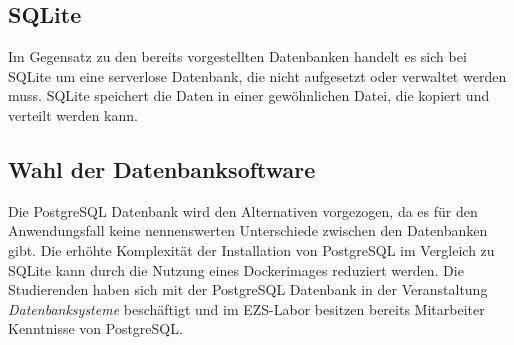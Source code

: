 \subsection{SQLite}
Im Gegensatz zu den bereits vorgestellten Datenbanken handelt es sich bei SQLite um eine serverlose Datenbank, die nicht aufgesetzt oder verwaltet werden muss. SQLite speichert die Daten in einer gewöhnlichen Datei, die kopiert und verteilt werden kann. \cite{sqliteFeaturesSQLite}

\subsection{Wahl der Datenbanksoftware}
Die PostgreSQL Datenbank wird den Alternativen vorgezogen, da es für den Anwendungsfall keine nennenswerten Unterschiede zwischen den Datenbanken gibt. Die erhöhte Komplexität der Installation von PostgreSQL im Vergleich zu SQLite kann durch die Nutzung eines \linebreak Dockerimages reduziert werden. Die Studierenden haben sich mit der PostgreSQL Datenbank in der Veranstaltung \textit{Datenbanksysteme} beschäftigt und im EZS-Labor besitzen bereits \linebreak Mitarbeiter Kenntnisse von PostgreSQL.